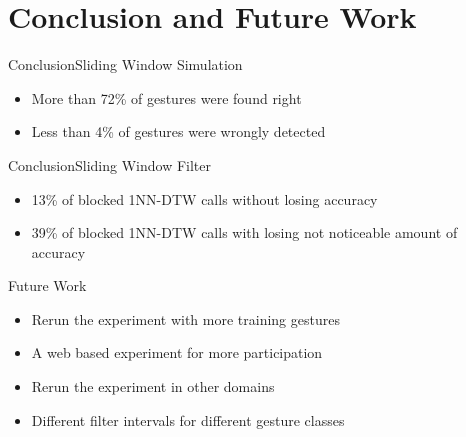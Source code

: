 \section{Conclusion and Future Work}

\begin{frame}{Conclusion}{Sliding Window Simulation}
    \begin{itemize}
        \item More than 72\% of gestures were found right
        
        \item Less than 4\% of gestures were wrongly detected
    \end{itemize}
\end{frame}

\begin{frame}{Conclusion}{Sliding Window Filter}
    \begin{itemize}
        \item 13\% of blocked 1NN-DTW calls without losing accuracy
        
        \item 39\% of blocked 1NN-DTW calls with losing not noticeable amount of accuracy
    \end{itemize}
\end{frame}

\begin{frame}{Future Work}
    \begin{itemize}
        \item Rerun the experiment with more training gestures
        
        \item A web based experiment for more participation
        
        \item Rerun the experiment in other domains
        
        \item Different filter intervals for different gesture classes
    \end{itemize}
\end{frame}
